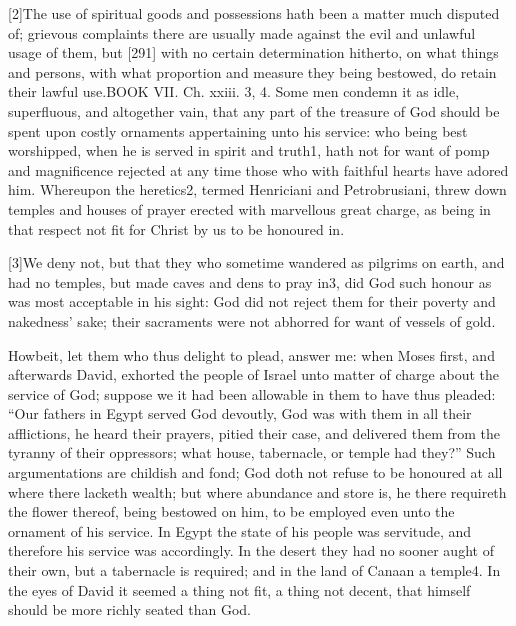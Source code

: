 [2]The use of spiritual goods and possessions hath been a matter much disputed of; grievous complaints there are usually made against the evil and unlawful usage of them, but [291] with no certain determination hitherto, on what things and persons, with what proportion and measure they being bestowed, do retain their lawful use.BOOK VII. Ch. xxiii. 3, 4. Some men condemn it as idle, superfluous, and altogether vain, that any part of the treasure of God should be spent upon costly ornaments appertaining unto his service: who being best worshipped, when he is served in spirit and truth1, hath not for want of pomp and magnificence rejected at any time those who with faithful hearts have adored him. Whereupon the heretics2, termed Henriciani and Petrobrusiani, threw down temples and houses of prayer erected with marvellous great charge, as being in that respect not fit for Christ by us to be honoured in.

[3]We deny not, but that they who sometime wandered as pilgrims on earth, and had no temples, but made caves and dens to pray in3, did God such honour as was most acceptable in his sight: God did not reject them for their poverty and nakedness’ sake; their sacraments were not abhorred for want of vessels of gold.

Howbeit, let them who thus delight to plead, answer me: when Moses first, and afterwards David, exhorted the people of Israel unto matter of charge about the service of God; suppose we it had been allowable in them to have thus pleaded: “Our fathers in Egypt served God devoutly, God was with them in all their afflictions, he heard their prayers, pitied their case, and delivered them from the tyranny of their oppressors; what house, tabernacle, or temple had they?” Such argumentations are childish and fond; God doth not refuse to be honoured at all where there lacketh wealth; but where abundance and store is, he there requireth the flower thereof, being bestowed on him, to be employed even unto the ornament of his service. In Egypt the state of his people was servitude, and therefore his service was accordingly. In the desert they had no sooner aught of their own, but a tabernacle is required; and in the land of Canaan a temple4. In the eyes of David it seemed a thing not fit, a thing not decent, that himself should be more richly seated than God.

